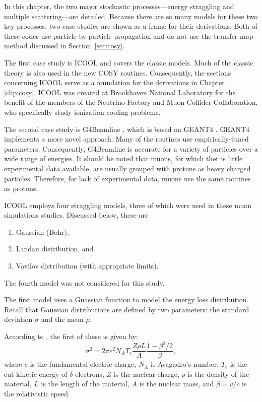 In this chapter, the two major stochastic processes---energy straggling and multiple scattering---are detailed. Because there are so many models for these two key processes, two case studies are shown as a frame for their derivations. Both of these codes use particle-by-particle propagation and do not use the transfer map method discussed in Section~\ref{sec:cosy}.

The first case study is ICOOL \cite{icool} and covers the classic models. Much of the classic theory is also used in the new COSY routines. Consequently, the sections concerning ICOOL serve as a foundation for the derivations in Chapter \ref{chp:cosy}. ICOOL was created at Brookhaven National Laboratory for the benefit of the members of the Neutrino Factory and Muon Collider Collaboration, who specifically study ionization cooling problems.

The second case study is G4Beamline \cite{g4bl}, which is based on GEANT4 \cite{geant4}. GEANT4 implements a more novel approach. Many of the routines use empirically-tuned parameters. Consequently, G4Beamline is accurate for a variety of particles over a wide range of energies. It should be noted that muons, for which thet is little experimental data available, are usually grouped with protons as heavy charged particles. Therefore, for lack of experimental data, muons use the same routines as protons.

 \label{sec:ICOOLStraggling}\par
ICOOL \cite{icool} employs four straggling models, three of which were used in these muon simulations studies. Discussed below, these are
\begin{enumerate}
\item{Gaussian (Bohr)},
\item{Landau distribution}, and
\item{Vavilov distribution (with appropriate limits)}.
\end{enumerate}
The fourth model was not considered for this study.

 \label{ssc:ICOOLStragglingGaussian}
The first model uses a Guassian function to model the energy loss distribution. Recall that Gaussian distributions are defined by two parameters: the standard deviation $\sigma$ and the mean $\mu$. 

According to \cite{geant4}, the first of these is given by:
\begin{equation}\label{eqn:bohrvariance}
\sigma^2=2\pi e^2 N_A T_c \frac{Z\rho L}{A} \frac{1-\beta^2/2}{\beta},
\end{equation}
where $e$ is the fundamental electric charge, $N_A$ is Avagadro's number, $T_c$ is the cut kinetic energy of $\delta$-electrons, $Z$ is the nuclear charge, $\rho$ is the density of the material, $L$ is the length of the material, $A$ is the nuclear mass, and $\beta=v/c$ is the relativistic speed.

